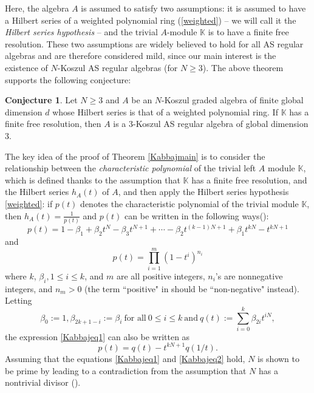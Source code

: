 \documentclass[reqno]{amsart}
\newcommand{\bbK}{\mathbb{K}}
\numberwithin{equation}{section}
\theoremstyle{plain}
\theoremstyle{definition}
\newtheorem{conj}{Conjecture}
\begin{document}
Here, the algebra $A$ is assumed to satisfy two assumptions: it is assumed to have a Hilbert series of a weighted polynomial ring (\ref{weighted}) --  we will call it the \emph{Hilbert series hypothesis} -- and the trivial $A$-module $\bbK$ is to have a finite free resolution. These two assumptions are widely believed to hold for all AS regular algebras and are therefore considered mild, since our main interest is the existence of $N$-Koszul AS regular algebras (for $N\geq 3$). The above theorem supports the following conjecture:

\begin{conj}\cite[Conjecture 1.3]{Kabbaj}\label{Kabbajconj}
    Let $N\geq3$ and $A$ be an $N$-Koszul graded algebra of finite global dimension $d$ whose Hilbert series is that of a weighted polynomial ring. If $\bbK$ has a finite free resolution, then $A$ is a 3-Koszul AS regular algebra of global dimension 3.
\end{conj}

The key idea of the proof of Theorem \ref{Kabbajmain} is to consider the relationship between the \emph{characteristic polynomial} of the trivial left $A$ module $\bbK$, which is defined thanks to the assumption that $\bbK$ has a finite free resolution, and the Hilbert series $h_A(t)$ of $A$, and then apply the Hilbert series hypothesis \ref{weighted}: if $p(t)$ denotes the characteristic polynomial of the trivial module $\bbK$, then $h_A(t)=\frac{1}{p(t)}$ and $p(t)$ can be written in the following ways(\cite[remark 3.2, (3.3.2), (3.3.1)]{Kabbaj}):
\begin{equation}\label{Kabbajeq1}
p(t)=1-\beta_1+\beta_2t^N-\beta_3t^{N+1}+\cdots-\beta_2t^{(k-1)N+1}+\beta_1t^{kN} -t^{kN+1}
\end{equation}
and
\begin{equation}\label{Kabbajeq2}
    p(t)=\prod_{i=1}^m(1-t^i)^{n_i}
\end{equation}
where $k$, $\beta_i, 1\leq i\leq k$, and $m$ are all positive integers, $n_i$'s are nonnegative integers, and $n_m>0$ (the term “positive" in \cite[remark 3.2]{Kabbaj} should be “non-negative" instead). Letting $$\beta_0:=1, \beta_{2k+1-i}:=\beta_{i}\ \text{for all}\ 0\leq i\leq k\ \text{and}\ q(t):=\sum^k_{i=0}\beta_{2i}t^{iN},$$ 
the expression \ref{Kabbajeq1} can also be written as
$$p(t)=q(t)-t^{kN+1}q(1/t).$$
Assuming that the equations \ref{Kabbajeq1} and \ref{Kabbajeq2} hold, $N$ is shown to be prime by leading to a contradiction from the assumption that $N$ has a nontrivial divisor (\cite[Theorem 3.7]{Kabbaj}).
\end{document}
